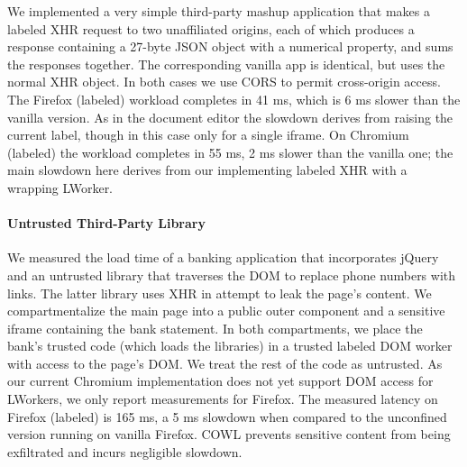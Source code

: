 We implemented a very simple third-party mashup application that makes
a labeled XHR request to two unaffiliated origins, each of which produces a
response containing a 27-byte JSON object with a numerical property,
and sums the responses together.
%
The corresponding vanilla app is identical, but uses the normal XHR
object.
%
In both cases we use CORS to permit cross-origin access.
%
The Firefox (labeled) workload completes in 41 ms, which is 6 ms slower
than the vanilla version.
%
As in the document editor the slowdown derives from raising the
current label, though in this case only for a single iframe.
%
On Chromium (labeled) the workload completes in 55 ms, 2 ms
slower than the vanilla one; the main slowdown here derives from
our implementing labeled XHR with a wrapping LWorker.

\paragraph{Untrusted Third-Party Library}

We measured the load time of a banking application that incorporates
jQuery and an untrusted library that traverses the DOM to replace
phone numbers with links.
%
The latter library uses XHR in attempt to leak the page's content.
%
We compartmentalize the main page into a public outer component and a
sensitive iframe containing the bank statement. In both
compartments, we place the bank's trusted code (which loads the
libraries) in a trusted labeled DOM worker with access to the page's
DOM. We treat the rest of the code as untrusted.
%
As our current Chromium implementation does not yet support DOM access
for LWorkers, we only report measurements for Firefox.
%
The measured latency on Firefox (labeled) is 165 ms, a 5 ms
slowdown when compared to the unconfined version running on vanilla
Firefox.
%
%
COWL prevents sensitive content from being exfiltrated and incurs
negligible slowdown.





